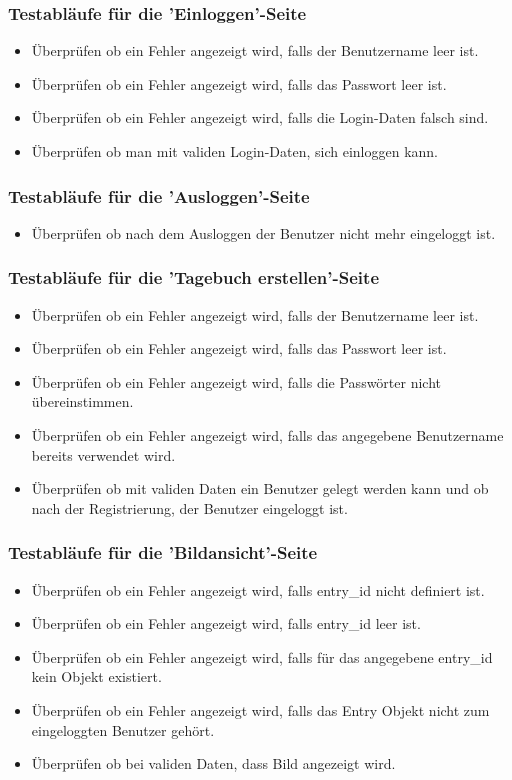 \subsubsection*{Testabläufe für die 'Einloggen'-Seite}
\begin{itemize}
  \item Überprüfen ob ein Fehler angezeigt wird, falls der Benutzername leer ist.
  \item Überprüfen ob ein Fehler angezeigt wird, falls das Passwort leer ist.
  \item Überprüfen ob ein Fehler angezeigt wird, falls die Login-Daten falsch sind.
  \item Überprüfen ob man mit validen Login-Daten, sich einloggen kann.
\end{itemize}

\subsubsection*{Testabläufe für die 'Ausloggen'-Seite}
\begin{itemize}
  \item Überprüfen ob nach dem Ausloggen der Benutzer nicht mehr eingeloggt ist.
\end{itemize}

\subsubsection*{Testabläufe für die 'Tagebuch erstellen'-Seite}
\begin{itemize}
  \item Überprüfen ob ein Fehler angezeigt wird, falls der Benutzername leer ist.
  \item Überprüfen ob ein Fehler angezeigt wird, falls das Passwort leer ist.
  \item Überprüfen ob ein Fehler angezeigt wird, falls die Passwörter nicht übereinstimmen.
  \item Überprüfen ob ein Fehler angezeigt wird, falls das angegebene Benutzername bereits verwendet wird.
  \item Überprüfen ob mit validen Daten ein Benutzer gelegt werden kann und ob nach der Registrierung, der Benutzer eingeloggt ist.
\end{itemize}

\subsubsection*{Testabläufe für die 'Bildansicht'-Seite}
\begin{itemize}
  \item Überprüfen ob ein Fehler angezeigt wird, falls entry\_id nicht definiert ist.
  \item Überprüfen ob ein Fehler angezeigt wird, falls entry\_id leer ist.
  \item Überprüfen ob ein Fehler angezeigt wird, falls für das angegebene entry\_id kein Objekt existiert.
  \item Überprüfen ob ein Fehler angezeigt wird, falls das Entry Objekt nicht zum eingeloggten Benutzer gehört.
  \item Überprüfen ob bei validen Daten, dass Bild angezeigt wird.
\end{itemize}
